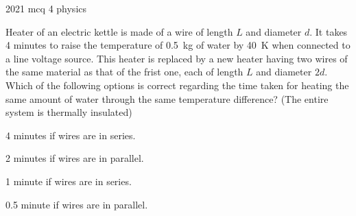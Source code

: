 \ylDisplay
{}%
{2021}%
{mcq}%
{4}%
{physics}%
{}%
{
\ifStatement
Heater of an electric kettle is made of a wire of length $L$ and diameter $d$. It takes 4 minutes to raise the temperature of \SI{0.5}{\kg} of water by \SI{40}{\K} when connected to a line voltage source. This heater is replaced by a new heater having two wires of the same material as that of the frist one, each of length $L$ and diameter $2d$. Which of the following options is correct regarding the time taken for heating the same amount of water through the same temperature difference? (The entire system is thermally insulated)
\fi


4 minutes if wires are in series.
\fi


2 minutes if wires are in parallel.
\fi


1 minute if wires are in series.
\fi


\num{0.5} minute if wires are in parallel.
\fi


\ifHint

\fi


\ifSolution

\fi


\ifEstStatement

\fi



\fi



\fi



\fi



\fi


\ifEstHint

\fi


\ifEstSolution

\fi
}
